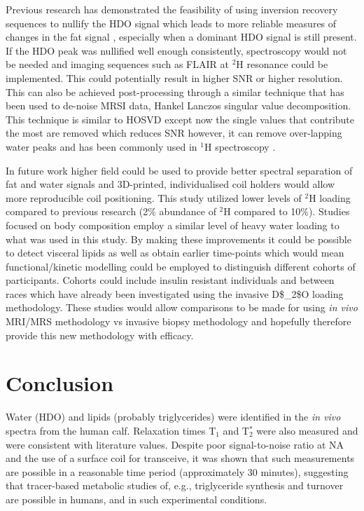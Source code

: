 Previous research has demonstrated the feasibility of using inversion recovery sequences to nullify the HDO signal which leads to more reliable measures of changes in the fat signal \cite{Brereton1989TheMice}, especially when a dominant \ac{HDO} signal is still present. If the \ac{HDO} peak was nullified well enough consistently, spectroscopy would not be needed and imaging sequences such as \ac{FLAIR} at $^2$H resonance could be implemented. This could potentially result in higher \ac{SNR} or higher resolution. This can also be achieved post-processing through a similar technique that has been used to de-noise \ac{MRSI} data, Hankel Lanczos singular value decomposition. This technique is similar to \ac{HOSVD} except now the single values that contribute the most are removed which reduces SNR however, it can remove over-lapping water peaks and has been commonly used in $^1$H spectroscopy \cite{Jansen20061HMetabolites, Cabanes2001OptimizationBrain}.

In future work higher field could be used to provide better spectral separation of fat and water signals and 3D-printed, individualised coil holders would allow more reproducible coil positioning. This study utilized lower levels of $^2$H loading compared to previous research (2\% abundance of $^2$H compared to 10\%). Studies focused on body composition employ a similar level of heavy water loading to what was used in this study. By making these improvements it could be possible to detect visceral lipids as well as obtain earlier time-points which would mean functional/kinetic modelling could be employed to distinguish different cohorts of participants. Cohorts could include insulin resistant individuals \cite{White2017AssociationHumans} and between races \cite{White2018RacialHumans} which have already been investigated using the invasive \ac{D$_2$O} loading methodology. These studies would allow comparisons to be made for using \textit{in vivo} \ac{MRI}/\ac{MRS} methodology vs invasive biopsy methodology and hopefully therefore provide this new methodology with efficacy.

\section{Conclusion}

Water (\ac{HDO}) and lipids (probably triglycerides) were identified in the \textit{in vivo} spectra from the human calf. Relaxation times T$_1$ and T$_2^*$ were also measured and were consistent with literature values. Despite poor signal-to-noise ratio at \ac{NA} and the use of a surface coil for transceive, it was shown that such measurements are possible in a reasonable time period (approximately 30 minutes), suggesting that tracer-based metabolic studies of, e.g., triglyceride synthesis and turnover are possible in humans, and in such experimental conditions.  

